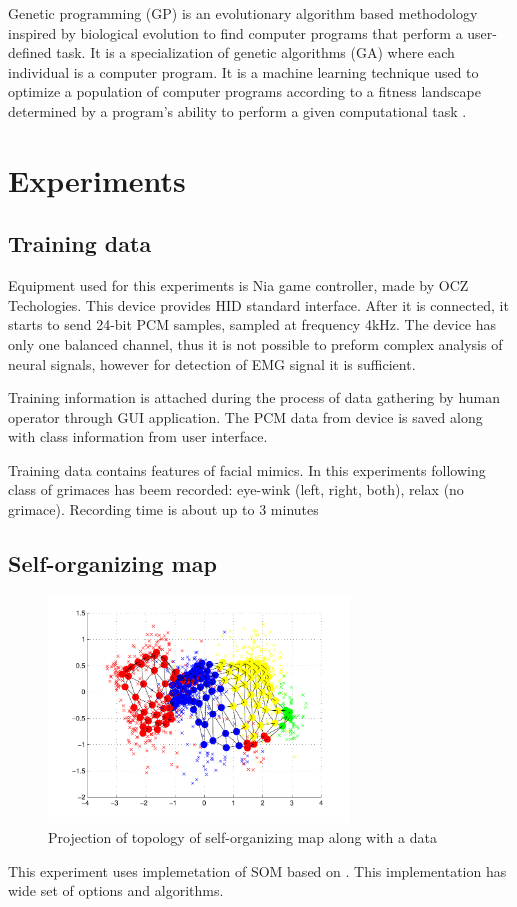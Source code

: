 \documentclass[a4paper,jurnal]{IEEEtran}
\begin{document}
Genetic programming (GP) is an evolutionary algorithm based methodology 
inspired by biological evolution to find computer programs that perform 
a user-defined task. 
It is a specialization of genetic algorithms (GA) where each 
individual is a computer program. 
It is a machine learning technique used to optimize a population of 
computer programs according to a fitness landscape determined by a 
program's ability to perform a given computational task \cite{gawiki}.


\section{Experiments}
\subsection{Training data} %
Equipment used for this experiments is {Nia game controller}, made by 
{OCZ Techologies}. This device provides HID standard interface.
After it is connected, it starts to send 24-bit PCM samples, 
sampled at frequency 4kHz. The device has only one balanced channel, thus 
it is not possible to preform complex analysis of neural signals,
however for detection of EMG signal it is sufficient.

Training information is attached during the process of data gathering by human operator 
through GUI application.
The PCM data from device is saved along with class information from
user interface.

Training data contains features of facial mimics. In this experiments
following class of grimaces has beem recorded: eye-wink (left, right, both), 
relax (no grimace).
Recording time is about up to 3 minutes

\subsection{Self-organizing map}
\begin{figure}[h]
	\centering
	\includegraphics[width=80mm]{som_topol_proj}
	\caption{Projection of topology of self-organizing map along with a data}
	\label{som_topol_proj}
\end{figure}
This experiment uses implemetation of SOM based on \cite{somtoolbox}.
This implementation has wide set of options and algorithms.
\end{document}
